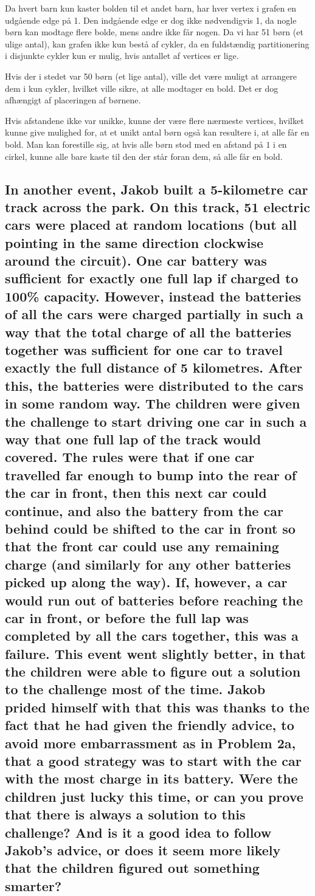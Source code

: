 \documentclass[a4paper,12pt]{article}
\begin{document}
Da hvert barn kun kaster bolden til et andet barn, har hver vertex i grafen en udgående edge på 1. Den indgående edge er dog ikke nødvendigvis 1, da nogle børn kan modtage flere bolde, mens andre ikke får nogen.
Da vi har 51 børn (et ulige antal), kan grafen ikke kun bestå af cykler, da en fuldstændig partitionering i disjunkte cykler kun er mulig, hvis antallet af vertices er lige.

Hvis der i stedet var 50 børn (et lige antal), ville det være muligt at arrangere dem i kun cykler, hvilket ville sikre, at alle modtager en bold. Det er dog afhængigt af placeringen af børnene.

Hvis afstandene ikke var unikke, kunne der være flere nærmeste vertices, hvilket kunne give mulighed for, at et unikt antal børn også kan resultere i, at alle får en bold. Man kan forestille sig, at hvis alle børn stod med en afstand på $1$ i en cirkel, kunne alle bare kaste til den der står foran dem, så alle får en bold.

\subsection[]{In another event, Jakob built a 5-kilometre car track across the park. On this track, 51 electric cars were placed at random locations (but all pointing in the same direction clockwise around the circuit). One car battery was sufficient for exactly one full lap if charged to 100\% capacity. However, instead the batteries of all the cars were charged partially in such a way that the total charge of all the batteries together was sufficient for one car to travel exactly the full distance of 5 kilometres. After this, the batteries were distributed to the cars in some random way. The children were given the challenge to start driving one car in such a way that one full lap of the track would covered. The rules were that if one car travelled far enough to bump into the rear of the car in front, then this next car could continue, and also the battery from the car behind could be shifted to the car in front so that the front car could use any remaining charge (and similarly for any other batteries picked up along the way). If, however, a car would run out of batteries before reaching the car in front, or before the full lap was completed by all the cars together, this was a failure. This event went slightly better, in that the children were able to figure out a solution to the challenge most of the time. Jakob prided himself with that this was thanks to the fact that he had given the friendly advice, to avoid more embarrassment as in Problem 2a, that a good strategy was to start with the car with the most charge in its battery. Were the children just lucky this time, or can you prove that there is always a solution to this challenge? And is it a good idea to follow Jakob’s advice, or does it seem more likely that the children figured out something smarter?}
\end{document}
